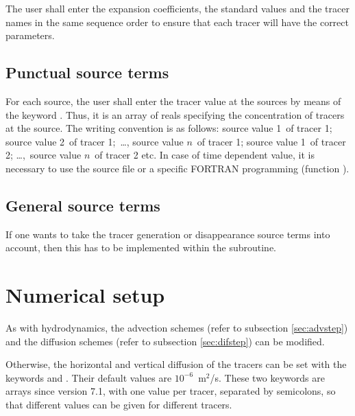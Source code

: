 The user shall enter the expansion coefficients, the standard values and the
tracer names in the same sequence order to ensure that each tracer will have
the correct parameters.

\subsection{Punctual source terms}

For each source, the user shall enter the tracer value at the sources by means
of the keyword . Thus, it is an
array of reals specifying the concentration of tracers at the source. The
writing convention is as follows: source value 1~of tracer 1; source value 2~of
tracer 1;~\dots , source value $n$~of tracer 1; source value 1~of tracer
2; \dots ,~source value $n$~of tracer 2 etc. In case of time dependent
value, it is necessary to use the source file or a specific FORTRAN programming
(function ).


\subsection{General source terms}

If one wants to take the tracer generation or disappearance source terms into
account, then this has to be implemented within the 
subroutine.

\section{Numerical setup}

As with hydrodynamics, the advection schemes  (refer to subsection \ref{sec:advstep}) and the diffusion schemes
 (refer to subsection
\ref{sec:difstep}) can be modified.

Otherwise, the horizontal and vertical diffusion of the tracers can be set with
the keywords  and
. Their default values
are $10^{-6}$~m${}^{2}$/s.
These two keywords are arrays since version 7.1, with one value per tracer,
separated by semicolons, so that different values can be given for different
tracers.